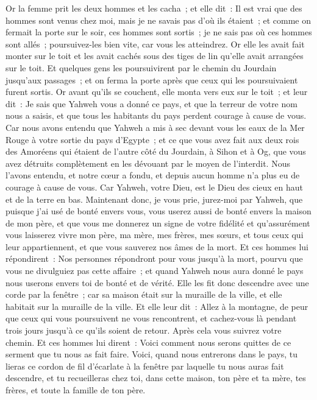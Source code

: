 \begin{multicols}{2}
Or la femme prit les deux hommes et les cacha~; et elle dit~: Il est vrai que des hommes sont venus chez moi, mais je ne savais pas d'où ils étaient~;
et comme on fermait la porte sur le soir, ces hommes sont sortis~; je ne sais pas où ces hommes sont allés~; poursuivez-les bien vite, car vous les atteindrez.
Or elle les avait fait monter sur le toit et les avait cachés sous des tiges de lin qu'elle avait arrangées sur le toit.
Et quelques gens les poursuivirent par le chemin du Jourdain jusqu'aux passages~; et on ferma la porte après que ceux qui les poursuivaient furent sortis.
Or avant qu'ils se couchent, elle monta vers eux sur le toit~;
et leur dit~: Je sais que Yahweh vous a donné ce pays, et que la terreur de votre nom nous a saisis, et que tous les habitants du pays perdent courage à cause de vous.
Car nous avons entendu que Yahweh a mis à sec devant vous les eaux de la Mer Rouge à votre sortie du pays d'Egypte~; et ce que vous avez fait aux deux rois des Amoréens qui étaient de l'autre côté du Jourdain, à Sihon et à Og, que vous avez détruits complètement en les dévouant par le moyen de l'interdit.
Nous l'avons entendu, et notre cœur a fondu, et depuis aucun homme n'a plus eu de courage à cause de vous. Car Yahweh, votre Dieu, est le Dieu des cieux en haut et de la terre en bas.
Maintenant donc, je vous prie, jurez-moi par Yahweh, que puisque j'ai usé de bonté envers vous, vous userez aussi de bonté envers la maison de mon père,
et que vous me donnerez un signe de votre fidélité et qu'assurément vous laisserez vivre mon père, ma mère, mes frères, mes sœurs, et tous ceux qui leur appartiennent, et que vous sauverez nos âmes de la mort.
Et ces hommes lui répondirent~: Nos personnes répondront pour vous jusqu'à la mort, pourvu que vous ne divulguiez pas cette affaire~; et quand Yahweh nous aura donné le pays nous userons envers toi de bonté et de vérité.
Elle les fit donc descendre avec une corde par la fenêtre~; car sa maison était sur la muraille de la ville, et elle habitait sur la muraille de la ville.
Et elle leur dit~: Allez à la montagne, de peur que ceux qui vous poursuivent ne vous rencontrent, et cachez-vous là pendant trois jours jusqu'à ce qu'ils soient de retour. Après cela vous suivrez votre chemin.
Et ces hommes lui dirent~: Voici comment nous serons quittes de ce serment que tu nous as fait faire.
Voici, quand nous entrerons dans le pays, tu lieras ce cordon de fil d'écarlate à la fenêtre par laquelle tu nous auras fait descendre, et tu recueilleras chez toi, dans cette maison, ton père et ta mère, tes frères, et toute la famille de ton père.

\end{multicols}
